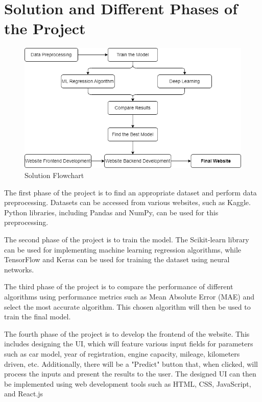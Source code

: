 \documentclass[a4paper,12pt]{article}
\begin{document}
\section*{Solution and Different Phases of the Project}
\begin{justify}
\begin{figure}[h]
    \centering
    \includegraphics[width=.8\textwidth]{./projectflow1.png}
    \caption{Solution Flowchart}
    \label{fig:your-label}
\end{figure}
\vspace{\baselineskip} 
The first phase of the project is to find an appropriate dataset and perform data preprocessing. Datasets can be accessed from various websites, such as Kaggle. Python libraries, including Pandas and NumPy, can be used for this preprocessing. 
\newline

The second phase of the project is to train the model. The Scikit-learn library can be used for implementing machine learning regression algorithms, while TensorFlow and Keras can be used for training the dataset using neural networks.
\newline

The third phase of the project is to compare the performance of different algorithms using performance metrics such as Mean Absolute Error (MAE) and select the most accurate algorithm. This chosen algorithm will then be used to train the final model.
\newline

The fourth phase of the project is to develop the frontend of the website. This includes designing the UI, which will feature various input fields for parameters such as car model, year of registration, engine capacity, mileage, kilometers driven, etc. Additionally, there will be a "Predict" button that, when clicked, will process the inputs and present the results to the user. The designed UI can then be implemented using web development tools such as HTML, CSS, JavaScript, and React.js
\newline


\end{justify}
\end{document}

